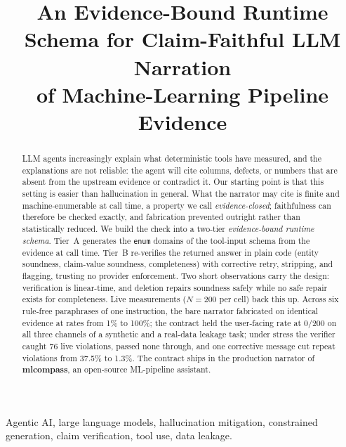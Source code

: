 \documentclass[conference]{IEEEtran}
\begin{document}
\title{An Evidence-Bound Runtime Schema for Claim-Faithful LLM Narration\\of Machine-Learning Pipeline Evidence}

\author{%
%
}

\maketitle

\begin{abstract}
LLM agents increasingly explain what deterministic tools have measured, and the explanations are not reliable: the agent will cite columns, defects, or numbers that are absent from the upstream evidence or contradict it. Our starting point is that this setting is easier than hallucination in general. What the narrator may cite is finite and machine-enumerable at call time, a property we call \emph{evidence-closed}; faithfulness can therefore be checked exactly, and fabrication prevented outright rather than statistically reduced. We build the check into a two-tier \emph{evidence-bound runtime schema}. Tier~A generates the \texttt{enum} domains of the tool-input schema from the evidence at call time. Tier~B re-verifies the returned answer in plain code (entity soundness, claim-value soundness, completeness) with corrective retry, stripping, and flagging, trusting no provider enforcement. Two short observations carry the design: verification is linear-time, and deletion repairs soundness safely while no safe repair exists for completeness. Live measurements ($N=200$ per cell) back this up. Across six rule-free paraphrases of one instruction, the bare narrator fabricated on identical evidence at rates from 1\% to 100\%; the contract held the user-facing rate at 0/200 on all three channels of a synthetic and a real-data leakage task; under stress the verifier caught 76 live violations, passed none through, and one corrective message cut repeat violations from 37.5\% to 1.3\%. The contract ships in the production narrator of \textbf{mlcompass}, an open-source ML-pipeline assistant.
\end{abstract}

\begin{IEEEkeywords}
Agentic AI, large language models, hallucination mitigation, constrained generation, claim verification, tool use, data leakage.
\end{IEEEkeywords}
\end{document}
